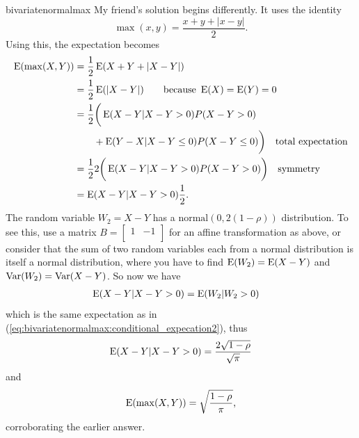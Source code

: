 \begin{answer}{bivariatenormalmax}
My friend's solution begins differently.
It uses the identity
\[
  \max(x,y) = \frac{x + y + |x-y|}{2}
  \text{.}
\]
Using this, the expectation becomes
\begin{align*}
  \operatorname{\mathrm{E}}(\max(X,Y))
  &= \frac{1}{2}\operatorname{\mathrm{E}}(X + Y + |X-Y|) \\
  &= \frac{1}{2}\operatorname{\mathrm{E}}(|X-Y|) \qquad \text{because } \operatorname{\mathrm{E}}(X) = \operatorname{\mathrm{E}}(Y) = 0 \\
  &= \frac{1}{2}
  \bigg(
     \operatorname{\mathrm{E}}(X-Y |X-Y > 0 ) P(X-Y > 0)  \\
  &\qquad + \operatorname{\mathrm{E}}(Y-X |X-Y \leq 0 ) P(X-Y \leq 0)
  \bigg) \quad \text{total expectation} \\
  &= \frac{1}{2} 2
    \bigg(
      \operatorname{\mathrm{E}}(X-Y |X-Y > 0 ) P(X-Y > 0)
    \bigg) \quad \text{symmetry} \\
  &=
    \operatorname{\mathrm{E}}(X-Y |X-Y > 0 ) \frac{1}{2}
\text{.}
\end{align*}
The random variable $W_2 = X-Y$ has a $\text{normal}(0, 2(1-\rho))$ distribution.
To see this, use a matrix $B=
\begin{bmatrix}
        1 &    -1 \\
\end{bmatrix}
$ for an affine transformation as above, or consider that the sum of two random variables each from a normal distribution is itself a normal distribution, where you have to find
$\operatorname{\mathrm{E}}(W_2) = \operatorname{\mathrm{E}}(X-Y)$
and
$\operatorname{\mathrm{Var}}(W_2) = \operatorname{\mathrm{Var}}(X-Y)$.
So now we have
\begin{align*}
\operatorname{\mathrm{E}}(X-Y|X-Y > 0) &=  \operatorname{\mathrm{E}}(W_2|W_2 > 0)
\end{align*}
which is the same expectation as in (\ref{eq:bivariatenormalmax:conditional_expecation2}), thus
\begin{align*}
\operatorname{\mathrm{E}}(X-Y|X-Y > 0) =
 \frac{ 2 \sqrt{ 1- \rho}  }{ \sqrt{ \pi} }
\end{align*}
and
\[
\operatorname{\mathrm{E}}(\max(X, Y)) = \sqrt{\frac{  1- \rho  }{  \pi }}
\text{,}
\]
corroborating the earlier answer.

\end{answer}

